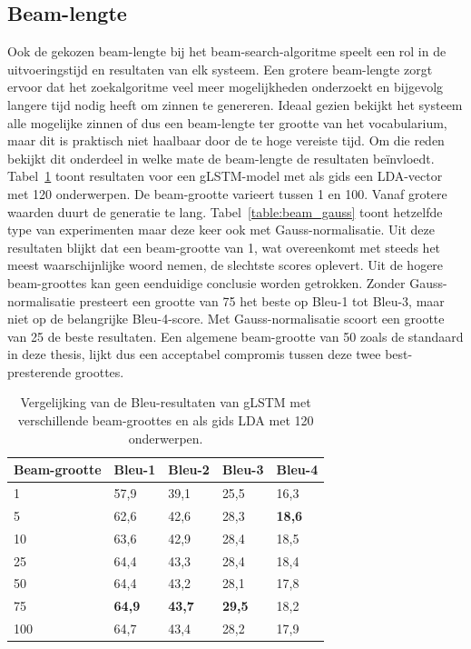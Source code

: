 \subsection{Beam-lengte}
Ook de gekozen beam-lengte bij het beam-search-algoritme speelt een rol in de uitvoeringstijd en resultaten van elk systeem. 
Een grotere beam-lengte zorgt ervoor dat het zoekalgoritme veel meer mogelijkheden onderzoekt en bijgevolg langere tijd nodig heeft om zinnen te genereren.
Ideaal gezien bekijkt het systeem alle mogelijke zinnen of dus een beam-lengte ter grootte van het vocabularium, maar dit is praktisch niet haalbaar door de te hoge vereiste tijd.
Om die reden bekijkt dit onderdeel in welke mate de beam-lengte de resultaten be\"invloedt.
Tabel~\ref{table:beam} toont resultaten voor een gLSTM-model met als gids een LDA-vector met 120 onderwerpen. De beam-grootte varieert tussen 1 en 100. Vanaf grotere waarden duurt de generatie te lang. Tabel~\ref{table:beam_gauss} toont hetzelfde type van experimenten maar deze keer ook met Gauss-normalisatie. Uit deze resultaten blijkt dat een beam-grootte van 1, wat overeenkomt met steeds het meest waarschijnlijke woord nemen, de slechtste scores oplevert. Uit de hogere beam-groottes kan geen eenduidige conclusie worden getrokken. Zonder Gauss-normalisatie presteert een grootte van 75 het beste op Bleu-1 tot Bleu-3, maar niet op de belangrijke Bleu-4-score. Met Gauss-normalisatie scoort een grootte van 25 de beste resultaten. Een algemene beam-grootte van 50 zoals de standaard in deze thesis, lijkt dus een acceptabel compromis tussen deze twee best-presterende groottes.

    \begin{table}
    	\centering
    	\begin{tabular}{lllll}
    		Beam-grootte                   & Bleu-1 & Bleu-2 & Bleu-3 & Bleu-4  \\ \hline
	    	1	      & 57,9   & 39,1   & 25,5   & 16,3        \\ 
    		5         & 62,6   & 42,6   & 28,3   & \textbf{18,6}     \\
    		10         & 63,6   & 42,9   & 28,4   & 18,5    \\
    		25        & 64,4   & 43,3   & 28,4   & 18,4     \\
    		50		  & 64,4   & 43,2   & 28,1   & 17,8    \\
    		75        & \textbf{64,9}   & \textbf{43,7}   & \textbf{29,5}   & 18,2    \\
    	    100		  & 64,7   & 43,4   & 28,2   & 17,9     \\\hline
    	\end{tabular}
    	\caption{Vergelijking van de Bleu-resultaten van gLSTM met verschillende beam-groottes en als gids LDA met 120 onderwerpen.}	
    	\label{table:beam}
    \end{table}

